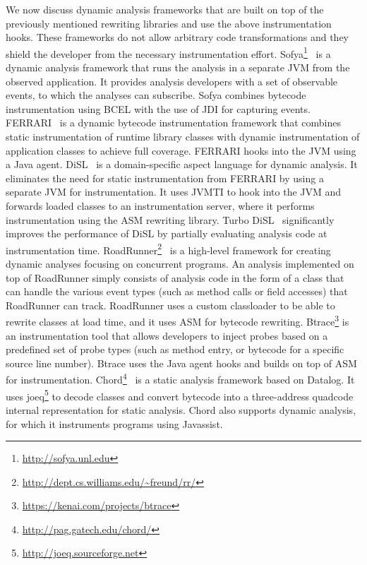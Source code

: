 We now discuss dynamic analysis frameworks that are built on top of the previously mentioned rewriting libraries
and use the above instrumentation hooks.
These frameworks do not allow arbitrary code transformations 
and they shield the developer from the necessary instrumentation effort.
%
Sofya\footnote{\url{http://sofya.unl.edu}}~\cite{kinneerSofyaSupportingRapid2007} 
is a dynamic analysis framework that runs the analysis in a separate JVM from the observed application.
It provides analysis developers with a set of observable events, to which the analyses can subscribe.
Sofya combines bytecode instrumentation using BCEL with the use of JDI for capturing events.
FERRARI~\cite{binderReengineeringStandardJava2007} is a dynamic bytecode instrumentation framework
that combines static instrumentation of runtime library classes with
dynamic instrumentation of application classes to achieve full coverage.
FERRARI hooks into the JVM using a Java agent.
DiSL~\cite{marekDiSLDomainspecificLanguage2012,marekDiSLExtensibleLanguage2012}
is a domain-specific aspect language for dynamic analysis.
It eliminates the need for static instrumentation from FERRARI
by using a separate JVM for instrumentation.
It uses JVMTI to hook into the JVM and 
forwards loaded classes to an instrumentation server,
where it performs instrumentation using the ASM rewriting library.
Turbo DiSL~\cite{zhengTurboDiSLPartial2012} significantly improves the performance of DiSL 
by partially evaluating analysis code at instrumentation time.
RoadRunner\footnote{\url{http://dept.cs.williams.edu/~freund/rr/}}~\cite{flanaganRoadRunnerDynamicAnalysis2010}
is a high-level framework for creating dynamic analyses focusing on concurrent programs.
An analysis implemented on top of RoadRunner simply consists of analysis code
in the form of a class that can handle the various event types 
(such as method calls or field accesses) that RoadRunner can track.
RoadRunner uses a custom classloader to be able to rewrite classes at load time,
and it uses ASM for bytecode rewriting.
Btrace\footnote{\url{https://kenai.com/projects/btrace}} is an instrumentation tool
that allows developers to inject probes based on a predefined set of probe types
(such as method entry, or bytecode for a specific source line number).
Btrace uses the Java agent hooks and builds on top of ASM for instrumentation.
Chord\footnote{\url{http://pag.gatech.edu/chord/}}~\cite{naik11} is a static analysis framework based on Datalog.
It uses joeq\footnote{\url{http://joeq.sourceforge.net}} to decode classes and 
convert bytecode into a three-address quadcode internal representation for static analysis.
Chord also supports dynamic analysis, 
for which it instruments programs using Javassist.

